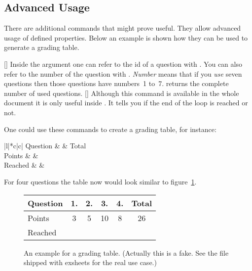 \documentclass[load-preamble+,scrartcl={DIV10}]{cnltx-doc}
\begin{document}
\subsection{Advanced Usage}

There are additional commands that might prove useful.  They
allow advanced usage of defined properties.  Below an example is shown how
they can be used to generate a grading table.
\begin{commands}
  []
    Inside the argument one can refer to the \ac{id} of a
    question with .  You can also refer to the number of the
    question with .  \emph{Number} means that if you \emph{use}
    seven questions then those questions have numbers~1 to~7.
  \expandable{}
     returns the complete number of used questions.
  \expandable{}[]
    Although this command is available in the whole document it is only useful
    inside .  It tells you if the end of the loop is
    reached or not.
\end{commands}

One could use these commands to create a grading table, for instance:
\begin{sourcecode}
  \begin{tabular}{|l|*{\numberofquestions}{c|}c|}\hline
    Question &
       &
      Total \\ \hline
    Points   &
       &
      \pointssum* \\ \hline
    Reached  &
      \ForEachQuestion{\iflastquestion{}{&}} & \\ \hline
  \end{tabular}
\end{sourcecode}
For four questions the table now would look similar to
figure~\ref{fig:grading-table}.

\begin{figure}[ht]
  \centering
  \begin{tabular}{|l|*{4}{c|}c|}\hline
    Question & 1. & 2. & 3. & 4. & Total \\ \hline
    Points   &  3 &  5 & 10 &  8 & 26 \\ \hline
    Reached  &    &    &    &    &    \\ \hline
  \end{tabular}
  \caption{An example for a grading table. (Actually this is a fake. See the
     file shipped with exsheets for the real use case.)}
  \label{fig:grading-table}
\end{figure}
\end{document}
